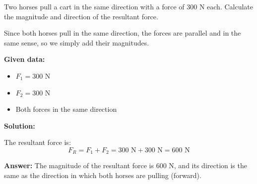 \begin{exercise}
    Two horses pull a cart in the same direction with a force of 300 N each.
    Calculate the magnitude and direction of the resultant force.


    \begin{solu}
        Since both horses pull in the same direction, the forces are parallel and in the same sense, so we simply add their magnitudes.

        \textbf{Given data:}
        \begin{itemize}
            \item $F_1 = 300$ N
            \item $F_2 = 300$ N
            \item Both forces in the same direction
        \end{itemize}

        \textbf{Solution:}

        The resultant force is:
        $$F_R = F_1 + F_2 = 300\text{ N} + 300\text{ N} = 600\text{ N}$$

        \textbf{Answer:} The magnitude of the resultant force is 600 N, and its direction is the same as the direction in which both horses are pulling (forward).
    \end{solu}
\end{exercise}



